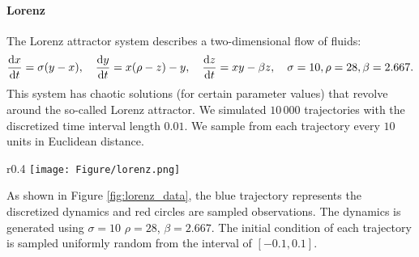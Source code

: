 \paragraph{Lorenz}
%
The Lorenz attractor system describes a two-dimensional flow of fluids:
%
\begin{eqnarray*}
	\frac{\mathop{}\!\mathrm{d} x}{\mathop{}\!\mathrm{d} t} = \sigma(y-x), \hspace{10pt}
	\frac{\mathop{}\!\mathrm{d} y}{\mathop{}\!\mathrm{d} t} = x(\rho -z) - y, \hspace{10pt}
	\frac{\mathop{}\!\mathrm{d} z}{\mathop{}\!\mathrm{d} t} = xy - \beta z, \hspace{10pt}
	\sigma=10, \rho=28, \beta=2.667.
\end{eqnarray*}
%
This system has chaotic solutions (for certain parameter values) that revolve around the so-called Lorenz attractor.
%
We simulated $10\,000$ trajectories with the discretized time interval length $0.01$. We sample from each trajectory every $10$ units in Euclidean distance. 
%
\begin{wrapfigure}{r}{0.4\linewidth}
	\texttt{[image: Figure/lorenz.png]}
			\caption{Lorenz Attractor}
			\label{fig:lorenz_data}
			\vspace{-3mm}
\end{wrapfigure}
As shown in Figure \ref{fig:lorenz_data}, the blue trajectory represents the discretized dynamics and red circles are sampled observations.  The dynamics is generated using $\sigma =10$ $\rho=28$, $\beta =2.667$. The initial condition of each trajectory is  sampled uniformly random from the interval of $[-0.1,0.1]$. 



